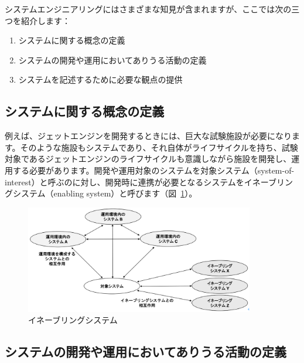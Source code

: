 システムエンジニアリングにはさまざまな知見が含まれますが、ここでは次の三つを紹介します：

\begin{enumerate}
    \item システムに関する概念の定義
    \item システムの開発や運用においてありうる活動の定義
    \item システムを記述するために必要な観点の提供
\end{enumerate}

\subsection{システムに関する概念の定義}

例えば、ジェットエンジンを開発するときには、巨大な試験施設が必要になります。そのような施設もシステムであり、それ自体がライフサイクルを持ち、試験対象であるジェットエンジンのライフサイクルも意識しながら施設を開発し、運用する必要があります。開発や運用対象のシステムを対象システム（system-of-interest）と呼ぶのに対し、開発時に連携が必要となるシステムをイネーブリングシステム（enabling system）と呼びます（図~\ref{figure:ch4-1}）。
\begin{figure}
    \begin{center}
    \includegraphics[width=100mm,bb=0 0 622 293]{safety_assurance_contents/ch4images/fig1.png}
    \caption{イネーブリングシステム}
    \label{figure:ch4-1}
    \end{center}
\end{figure}

\subsection{システムの開発や運用においてありうる活動の定義}

